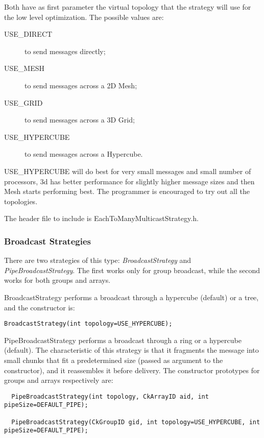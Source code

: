 {Both have as first parameter the virtual topology that the strategy will use for
the low level optimization. The possible values are:

\begin{description}
\item[USE\_DIRECT] to send messages directly;
\item[USE\_MESH] to send messages across a 2D Mesh;
\item[USE\_GRID] to send messages across a 3D Grid;
\item[USE\_HYPERCUBE] to send messages across a Hypercube.
\end{description}

USE\_HYPERCUBE will do best for very small messages and small number of
processors, 3d has better performance for slightly higher message sizes and then
Mesh starts performing best. The programmer is encouraged to try out all the
topologies.

The header file to include is {\textrm{EachToManyMulticastStrategy.h}}.

\subsubsection{Broadcast Strategies}

There are two strategies of this type: {\em BroadcastStrategy} and {\em
PipeBroadcastStrategy}. The first works only for group broadcast, while the
second works for both groups and arrays.

BroadcastStrategy performs a broadcast through a hypercube (default) or a tree,
and the constructor is:

\begin{verbatim}
BroadcastStrategy(int topology=USE_HYPERCUBE);
\end{verbatim}

PipeBroadcastStrategy performs a broadcast through a ring or a hypercube
(default). The characteristic of this strategy is that it fragments the message
into small chunks that fit a predetermined size (passed as argument to the
constructor), and it reassembles it before delivery. The constructor prototypes
for groups and arrays respectively are:

\begin{verbatim}
  PipeBroadcastStrategy(int topology, CkArrayID aid, int pipeSize=DEFAULT_PIPE);

  PipeBroadcastStrategy(CkGroupID gid, int topology=USE_HYPERCUBE, int pipeSize=DEFAULT_PIPE);
\end{verbatim}

}

